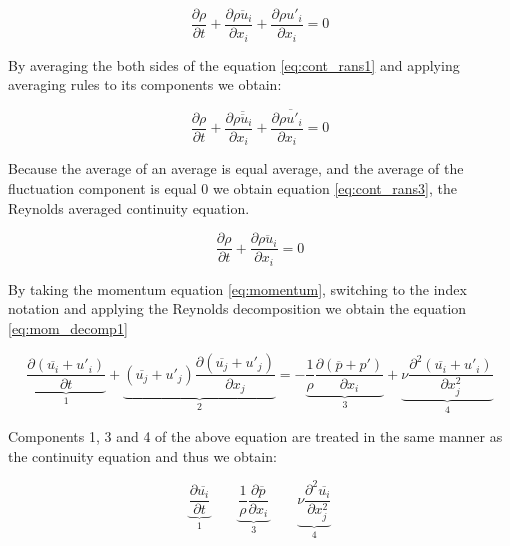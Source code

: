 \begin{equation} \label{eq:cont_rans1}
\frac{\partial \rho}{\partial t} + \frac{\partial \overline{\rho u_i}}{\partial x_i} + \frac{\partial \rho u'_i}{\partial x_i} = 0
\end{equation}

By averaging the both sides of the equation  \ref{eq:cont_rans1} and applying averaging rules to its components we obtain:

\begin{equation} \label{eq:cont_rans2}
\frac{\partial \rho}{\partial t} + \frac{\partial \overline{\overline{\rho u_i}}}{\partial x_i} + \frac{\partial \overline{\rho u'_i}}{\partial x_i} = 0
\end{equation}

Because the average of an average is equal average, and  the average of the fluctuation component is equal 0 we obtain equation \ref{eq:cont_rans3}, the Reynolds averaged continuity equation.

\begin{equation} \label{eq:cont_rans3}
\frac{\partial \rho}{\partial t} + \frac{\partial \overline{\rho u_i}}{\partial x_i} = 0
\end{equation}

By taking the momentum equation \ref{eq:momentum}, switching to the index notation and applying the Reynolds decomposition we obtain the equation \ref{eq:mom_decomp1}

\begin{equation} \label{eq:mom_decomp1}
\underbrace{\frac{\partial \left( \overline{u_i} + u'_i \right)}{\partial t}}_\text{1} 
+ \underbrace{\left( \overline{u_j} + u'_j \right) \frac{\partial \left( \overline{u_j} + u'_j \right)}{\partial x_j}}_\text{2} 
=
- \underbrace{\frac{1}{\rho} \frac{\partial \left( \overline{p} + p' \right)}{\partial x_i}}_\text{3} 
+ \underbrace{\nu \frac{\partial^2 \left( \overline{u_i} + u'_i \right)}{\partial x_j^2}}_\text{4} 
\end{equation}

Components 1, 3 and 4 of the above equation are treated in the same manner as the continuity equation and thus we obtain:

\begin{equation} \label{eq:mom_components}
\underbrace{\frac{\partial \overline{u_i}}{\partial t}}_\text{1}
\qquad
\underbrace{\frac{1}{\rho} \frac{\partial \overline{p}}{\partial x_i}}_\text{3}
\qquad
\underbrace{\nu \frac{\partial^2 \overline{u_i}}{\partial x_j^2}}_\text{4}
\end{equation}

